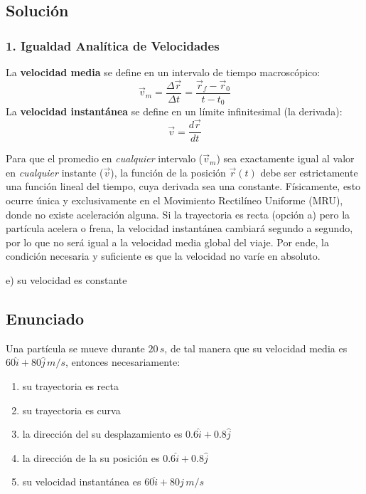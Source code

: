 \documentclass[12pt, a4paper]{article}
\begin{document}
\subsection*{Solución}

\subsubsection*{1. Igualdad Analítica de Velocidades}
La \textbf{velocidad media} se define en un intervalo de tiempo macroscópico:
$$ \vec{v}_m = \frac{\Delta \vec{r}}{\Delta t} = \frac{\vec{r}_f - \vec{r}_0}{t - t_0} $$
La \textbf{velocidad instantánea} se define en un límite infinitesimal (la derivada):
$$ \vec{v} = \frac{d\vec{r}}{dt} $$

Para que el promedio en \textit{cualquier} intervalo ($\vec{v}_m$) sea exactamente igual al valor en \textit{cualquier} instante ($\vec{v}$), la función de la posición $\vec{r}(t)$ debe ser estrictamente una función lineal del tiempo, cuya derivada sea una constante. 
Físicamente, esto ocurre única y exclusivamente en el Movimiento Rectilíneo Uniforme (MRU), donde no existe aceleración alguna. 
Si la trayectoria es recta (opción a) pero la partícula acelera o frena, la velocidad instantánea cambiará segundo a segundo, por lo que no será igual a la velocidad media global del viaje. Por ende, la condición necesaria y suficiente es que la velocidad no varíe en absoluto.

\begin{tcolorbox}[colback=green!5!white, colframe=green!50!black, title=Respuesta Final]
\centering \Large e) su velocidad es constante
\end{tcolorbox}

\newpage

\subsection*{Enunciado}
Una partícula se mueve durante $20\,\si{s}$, de tal manera que su velocidad media es $60\hat{i} + 80\hat{j} \,\si{m/s}$, entonces necesariamente:
\begin{enumerate}[label=\alph*)]
    \item su trayectoria es recta
    \item su trayectoria es curva
    \item la dirección del su desplazamiento es $0.6\hat{i} + 0.8\hat{j}$
    \item la dirección de la su posición es $0.6\hat{i} + 0.8\hat{j}$
    \item su velocidad instantánea es $60\hat{i} + 80\hat{j} \,\si{m/s}$
\end{enumerate}
\end{document}
